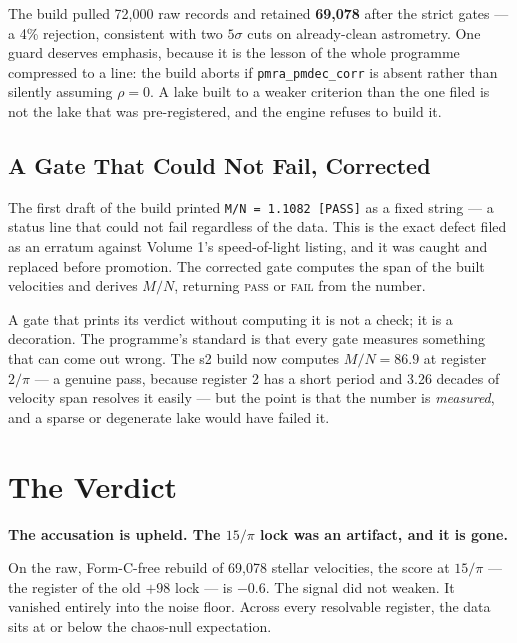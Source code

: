 \documentclass[11pt, letterpaper, openany]{book}
\begin{document}
The build pulled 72{,}000 raw records and retained \textbf{69{,}078} after the strict gates ---
a 4\% rejection, consistent with two $5\sigma$ cuts on already-clean astrometry. One guard
deserves emphasis, because it is the lesson of the whole programme compressed to a line: the
build aborts if \texttt{pmra\_pmdec\_corr} is absent rather than silently assuming $\rho = 0$. A
lake built to a weaker criterion than the one filed is not the lake that was pre-registered, and
the engine refuses to build it.

\subsection{A Gate That Could Not Fail, Corrected}

The first draft of the build printed \texttt{M/N = 1.1082 [PASS]} as a fixed string --- a status
line that could not fail regardless of the data. This is the exact defect filed as an erratum
against Volume 1's speed-of-light listing, and it was caught and replaced before promotion. The
corrected gate computes the span of the built velocities and derives $M/N$, returning
\textsc{pass} or \textsc{fail} from the number.

\begin{correctionbox}
A gate that prints its verdict without computing it is not a check; it is a decoration. The
programme's standard is that every gate measures something that can come out wrong. The s2 build
now computes $M/N = 86.9$ at register $2/\pi$ --- a genuine pass, because register 2 has a short
period and 3.26 decades of velocity span resolves it easily --- but the point is that the number
is \emph{measured}, and a sparse or degenerate lake would have failed it.
\end{correctionbox}

\section{The Verdict}

\begin{nullbox}
\textbf{The accusation is upheld. The $15/\pi$ lock was an artifact, and it is gone.}

\medskip
On the raw, Form-C-free rebuild of 69{,}078 stellar velocities, the score at $15/\pi$ ---
the register of the old $+98$ lock --- is $\mathbf{-0.6}$. The signal did not weaken. It
vanished entirely into the noise floor. Across every resolvable register, the data sits at or
below the chaos-null expectation.
\end{nullbox}
\end{document}
